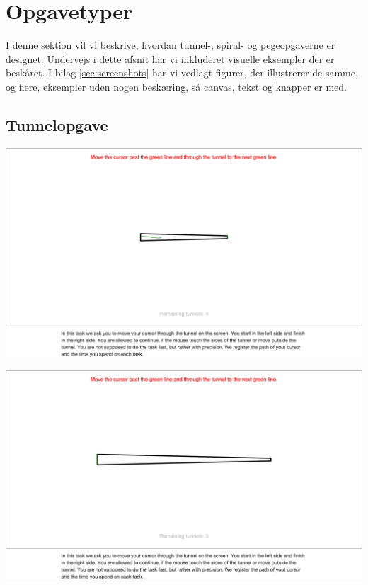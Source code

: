 \section*{Opgavetyper}
I denne sektion vil vi beskrive, hvordan tunnel-, spiral- og pegeopgaverne er designet. Undervejs i dette afsnit har vi inkluderet visuelle eksempler der er beskåret. I bilag \ref{sec:screenshots} har vi vedlagt figurer, der illustrerer de samme, og flere, eksempler uden nogen beskæring, så canvas, tekst og knapper er med.

\subsection*{Tunnelopgave}
\begin{minipage}{\linewidth}
	\begin{minipage}{\textwidth}
		\centering
		\includegraphics[width=\textwidth, trim = .5cm 23cm .5cm 15cm, clip]{images/screenshots/ex_step_4_tunnel_path}
		\label{fig:ex_tunnel_1}
	\end{minipage}
	\begin{minipage}{\textwidth}
		\centering
		\includegraphics[width=\textwidth, trim = .5cm 22cm .5cm 15cm, clip]{images/screenshots/ex_step_4_tunnel_2}

\end{minipage}
\end{minipage}
